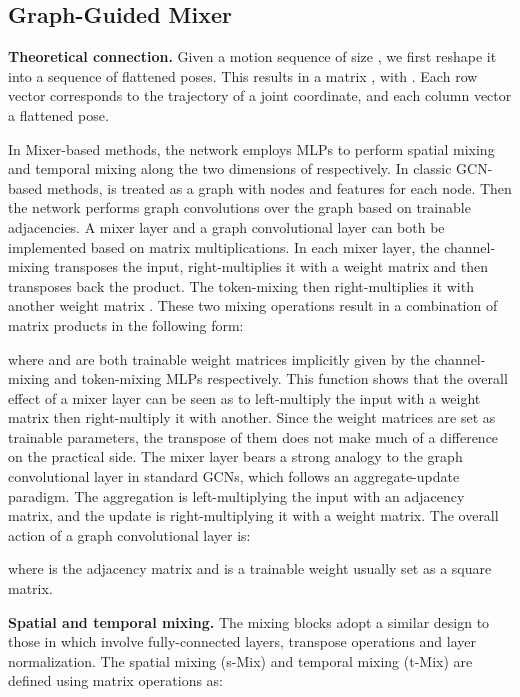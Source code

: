\documentclass[10pt,twocolumn,letterpaper]{article}
\begin{document}
\subsection{Graph-Guided Mixer}\label{our method}

\noindent\textbf{Theoretical connection.}
Given a motion sequence of size , we first reshape it into a sequence of flattened poses.
This results in a matrix , with . Each row vector  corresponds to the trajectory of a joint coordinate, and each column vector a flattened pose.

In Mixer-based methods, the network employs MLPs to perform spatial mixing and temporal mixing along the two dimensions of  respectively.
In classic GCN-based methods,  is treated as a graph with  nodes and  features for each node. Then the network performs graph convolutions over the graph based on trainable adjacencies.
A mixer layer and a graph convolutional layer can both be implemented based on matrix multiplications.
In each mixer layer, the channel-mixing transposes the input, right-multiplies it with a weight matrix  and then transposes back the product.
The token-mixing then right-multiplies it with another weight matrix .
These two mixing operations result in a combination of matrix products in the following form:

where  and  are both trainable weight matrices implicitly given by the channel-mixing and token-mixing MLPs respectively.
This function shows that the overall effect of a mixer layer can be seen as to left-multiply the input with a weight matrix then right-multiply it with another.
Since the weight matrices are set as trainable parameters, the transpose of them does not make much of a difference on the practical side.
The mixer layer bears a strong analogy to the graph convolutional layer in standard GCNs, which follows an aggregate-update paradigm.
The aggregation is left-multiplying the input with an adjacency matrix, and the update is right-multiplying it with a weight matrix. The overall action of a graph convolutional layer is:

where  is the adjacency matrix and  is a trainable weight usually set as a square matrix.








    


\noindent\textbf{Spatial and temporal mixing.}
The mixing blocks adopt a similar design to those in \cite{tolstikhin2021mlp,guo2023back} which involve fully-connected layers, transpose operations and layer normalization. The spatial mixing (s-Mix) and temporal mixing (t-Mix) are defined using matrix operations as:
\end{document}
